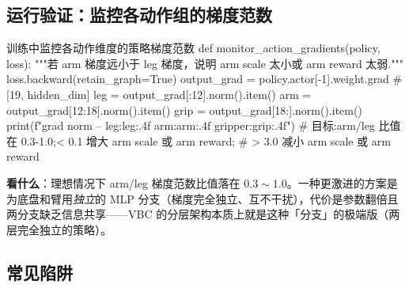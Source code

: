 \subsection{运行验证：监控各动作组的梯度范数}
\label{sec:rlmc-lm-action-verify}

\begin{codebox}[Python]{训练中监控各动作维度的策略梯度范数}
def monitor_action_gradients(policy, loss):
    """若 arm 梯度远小于 leg 梯度，说明 arm scale 太小或 arm reward 太弱."""
    loss.backward(retain_graph=True)
    output_grad = policy.actor[-1].weight.grad        # [19, hidden_dim]
    leg = output_grad[:12].norm().item()
    arm = output_grad[12:18].norm().item()
    grip = output_grad[18:].norm().item()
    print(f"grad norm -- leg:{leg:.4f}  arm:{arm:.4f}  gripper:{grip:.4f}")
    # 目标:arm/leg 比值在 0.3-1.0;< 0.1 增大 arm scale 或 arm reward;
    #       > 3.0 减小 arm scale 或 arm reward
\end{codebox}

\textbf{看什么}：理想情况下 arm/leg 梯度范数比值落在 $0.3\!\sim\!1.0$。一种更激进的方案是为底盘和臂用\emph{独立}的 MLP 分支（梯度完全独立、互不干扰），代价是参数翻倍且两分支缺乏信息共享——VBC 的分层架构本质上就是这种「分支」的极端版（两层完全独立的策略）。

\subsection{常见陷阱}
\label{sec:rlmc-lm-action-pitfalls}



